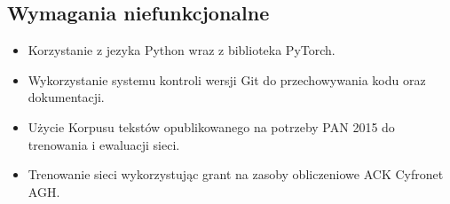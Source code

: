 \newpage
\subsection{Wymagania niefunkcjonalne}
\begin{itemize}
 	\item Korzystanie z jezyka Python wraz z biblioteka PyTorch.
 	\item Wykorzystanie systemu kontroli wersji Git do przechowywania kodu oraz dokumentacji.
 	\item Użycie Korpusu tekstów opublikowanego na potrzeby PAN 2015 do trenowania i ewaluacji sieci.
 	\item Trenowanie sieci wykorzystując grant na zasoby obliczeniowe ACK Cyfronet AGH.
\end{itemize}
